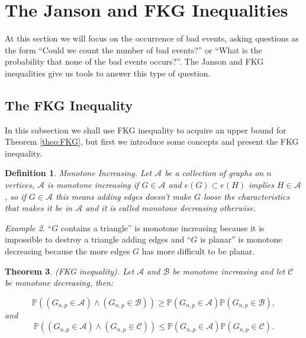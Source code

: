 \documentclass[12pt,twoside,a4paper]{book}
\numberwithin{equation}{section}
\newtheorem{theorem}             {Theorem}[section]
\newtheorem{definition}	[theorem] {Definition}
\theoremstyle{remark}
\newtheorem{example}	[theorem] {Example}
\begin{document}
\section{The Janson and FKG Inequalities}

At this section we will focus on the occurrence of  bad events, asking questions as the form ``Could we count the number of bad events?'' or ``What is the probability that none of the bad events occurs?''. The Janson and FKG inequalities give us tools to answer this type of question.

\subsection{The FKG Inequality}
In this subsection we shall use FKG inequality to acquire an upper bound for Theorem \ref{theo:FKG}, but first we introduce some concepts and present the FKG inequality.

\begin{definition}
Monotone Increasing. Let $\mathcal{A}$ be a collection of graphs on $n$ vertices, $\mathcal{A}$ is monotone increasing if $G \in \mathcal{A}$ and $e(G) \subset e(H)$ implies $H \in \mathcal{A}$, so if $G \in \mathcal{A}$ this means adding edges doesn't make $G$ loose the characteristics that makes it be in $\mathcal{A}$ and it is called monotone decreasing otherwise.     
\end{definition}

\begin{example}
``$G$ contains a triangle'' is monotone increasing because it is impossible to destroy a triangle adding edges and ``$G$ is planar'' is monotone decreasing because the more edges $G$ has more difficult to be planar.
\end{example}

\begin{theorem} (FKG inequality).
 Let $\mathcal{A}$ and $\mathcal{B}$ be monotone increasing and let $\mathcal{C}$ be monotone decreasing, then:

$$ \mathbb{P}((G_{n,p} \in \mathcal{A}) \wedge (G_{n,p} \in \mathcal{B})) \geq \mathbb{P}(G_{n,p} \in \mathcal{A})\mathbb{P}(G_{n,p} \in \mathcal{B}),$$
and
$$ \mathbb{P}((G_{n,p} \in \mathcal{A}) \wedge (G_{n,p} \in \mathcal{C})) \leq \mathbb{P}(G_{n,p} \in \mathcal{A})\mathbb{P}(G_{n,p} \in \mathcal{C}).$$
\end{theorem}
\end{document}

